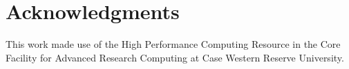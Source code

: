 \newpage
\begin{abstractpage}

\end{abstractpage}

% 

\newpage

\section*{Acknowledgments}

\par This work made use of the High Performance Computing Resource in the Core Facility for Advanced Research Computing at Case Western Reserve University.

